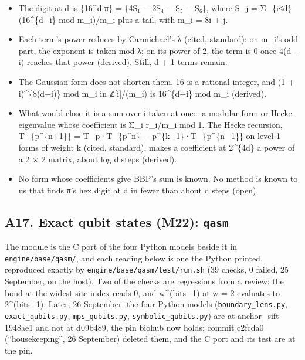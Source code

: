 \begin{itemize}
\begin{itemize}
\item The digit at d is \{16\textasciicircum{}d π\} = \{4S₁ − 2S₄ − S₅ − S₆\}, where S\_\allowbreak{}j = Σ\_\allowbreak{}\{i≤d\} (16\textasciicircum{}\{d−i\} mod m\_\allowbreak{}i)/m\_\allowbreak{}i plus a tail, with m\_\allowbreak{}i = 8i + j.
\item Each term's power reduces by Carmichael's λ (cited, standard): on m\_\allowbreak{}i's odd part, the exponent is taken mod λ; on its power of 2, the term is 0 once 4(d − i) reaches that power (derived). Still, d + 1 terms remain.
\item The Gaussian form does not shorten them. 16 is a rational integer, and (1 + i)\textasciicircum{}\{8(d−i)\} mod m\_\allowbreak{}i in ℤ[i]/(m\_\allowbreak{}i) is 16\textasciicircum{}\{d−i\} mod m\_\allowbreak{}i (derived).
\item What would close it is a sum over i taken at once: a modular form or Hecke eigenvalue whose coefficient is Σ\_\allowbreak{}i r\_\allowbreak{}i/m\_\allowbreak{}i mod 1. The Hecke recursion, T\_\allowbreak{}\{p\textasciicircum{}\{n+1\}\} = T\_\allowbreak{}p·T\_\allowbreak{}\{p\textasciicircum{}n\} − p\textasciicircum{}\{k−1\}·T\_\allowbreak{}\{p\textasciicircum{}\{n−1\}\} on level-1 forms of weight k (cited, standard), makes a coefficient at 2\textasciicircum{}\{4d\} a power of a 2 × 2 matrix, about log d steps (derived).
\item No form whose coefficients give BBP's sum is known. No method is known to us that finds π's hex digit at d in fewer than about d steps (open).
\end{itemize}
\end{itemize}

\subsection{\texorpdfstring{A17. Exact qubit states (M22): \texttt{qasm}}{A17. Exact qubit states (M22): qasm}}

The module is the C port of the four Python models beside it in \texttt{engine/\allowbreak{}base/\allowbreak{}qasm/\allowbreak{}}, and each reading below is one the Python printed, reproduced exactly by \texttt{engine/\allowbreak{}base/\allowbreak{}qasm/\allowbreak{}test/\allowbreak{}run.\allowbreak{}sh} (39 checks, 0 failed, 25 September, on the host). Two of the checks are regressions from a review: the bond at the widest site index reads 0, and w\textasciicircum{}(bits−1) at w = 2 evaluates to 2\textasciicircum{}(bits−1). Later, 26 September: the four Python models (\texttt{boundary\_\allowbreak{}lens.\allowbreak{}py}, \texttt{exact\_\allowbreak{}qubits.\allowbreak{}py}, \texttt{mps\_\allowbreak{}qubits.\allowbreak{}py}, \texttt{symbolic\_\allowbreak{}qubits.\allowbreak{}py}) are at anchor\_\allowbreak{}sift 1948ae1 and not at d09b489, the pin biohub now holds; commit c2fcda0 (“housekeeping”, 26 September) deleted them, and the C port and its test are at the pin.

